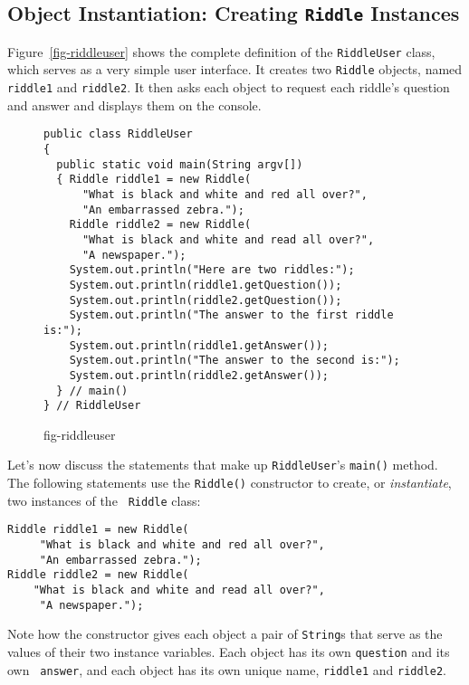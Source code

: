 \subsection{Object Instantiation: Creating {\tt Riddle} Instances}

\noindent Figure~\ref{fig-riddleuser} shows the complete definition of the
{\tt RiddleUser} class, which serves as a very simple user
interface. It creates two {\tt Riddle} objects, named {\tt riddle1}
and {\tt riddle2}. It then asks each object to request each riddle's
question and answer and displays them on the console.

\begin{figure}[bh]
\jjjprogstart
\begin{jjjlisting}[27pc]
\begin{lstlisting}
public class RiddleUser
{
  public static void main(String argv[])
  { Riddle riddle1 = new Riddle(
      "What is black and white and red all over?",
      "An embarrassed zebra.");
    Riddle riddle2 = new Riddle(
      "What is black and white and read all over?",
      "A newspaper.");
    System.out.println("Here are two riddles:");
    System.out.println(riddle1.getQuestion());
    System.out.println(riddle2.getQuestion());
    System.out.println("The answer to the first riddle is:");
    System.out.println(riddle1.getAnswer());
    System.out.println("The answer to the second is:");
    System.out.println(riddle2.getAnswer());
  } // main()
} // RiddleUser
\end{lstlisting}
\end{jjjlisting}
{fig-riddleuser}
\end{figure}

\noindent Let's now discuss the statements that make up {\tt RiddleUser}'s 
{\tt main()} method.  The following statements use the {\tt Riddle()}
constructor to create, or {\it instantiate}, two instances of the {\tt
Riddle} class:

\begin{jjjlisting}
\begin{lstlisting}
Riddle riddle1 = new Riddle(
     "What is black and white and red all over?",
     "An embarrassed zebra.");
Riddle riddle2 = new Riddle(
    "What is black and white and read all over?",
     "A newspaper.");
\end{lstlisting}
\end{jjjlisting}

\noindent Note how the constructor gives each object a pair
of {\tt String}s that serve as the values of their two instance
variables. Each object has its own {\tt question} and its own {\tt
answer}, and each object has its own unique name, {\tt riddle1} and
{\tt riddle2}.

